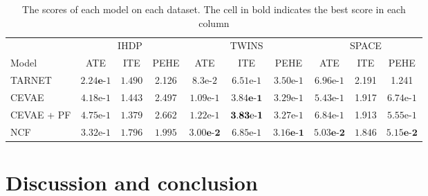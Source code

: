 \documentclass{report}
\begin{document}
\renewcommand{\arraystretch}{1.3}
\begin{table}[]
    \centering
    \begin{adjustbox}{center}
    \begin{tabular}{l||c|c|c||c|c|c||c|c|c|}
        & \multicolumn{3}{|c||}{IHDP} & \multicolumn{3}{|c||}{TWINS} & \multicolumn{3}{|c|}{SPACE} \\ 
         Model & ATE & ITE & PEHE & ATE & ITE & PEHE & ATE & ITE & PEHE \\
         \hline \hline
         TARNET & $\mathbf{2.24\text{e-}}1$ & $1.490$ & 2.126 &   $8.3\text{e-}2$ & $6.51\text{e-}1$ & $3.50\text{e-}1$ &     $6.96\text{e-}1$ & 2.191 & 1.241\\
         \hline
         CEVAE & $4.18\text{e-}1$ & 1.443 & 2.497 &    $1.09\text{e-}1$ & $\mathbf{3.84\textbf{e-}1}$ & $3.29\text{e-}1$ & $5.43\text{e-}1$ & 1.917 & $6.74\text{e-}1$\\
         \hline
         CEVAE + PF & $4.75\text{e-}1$ & $\mathbf{1.379}$ &  2.662 & $1.22\text{e-}1$ & $\mathbf{3.83\text{\text{e-}}1}$ & $3.27\text{e-}1$ & $6.84\text{e-}1$ & 1.913 & $5.55\text{e-}1$ \\
         \hline
         NCF & $3.32\text{e-}1$ & $1.796$ & $\mathbf{1.995}$ &    $\mathbf{3.00\text{e-}2}$ & $6.85\text{e-}1$ & $\mathbf{3.16\text{e-}1}$ & \textbf{$\mathbf{5.03\text{e-}2}$} & $\mathbf{1.846}$ & \textbf{$\mathbf{5.15\text{e-}2}$} \\
    \end{tabular}
    \end{adjustbox}
    \caption{The scores of each model on each dataset. The cell in bold indicates the best score in each column}
    \label{tab:results_experiments}
\end{table}


\chapter{Discussion and conclusion}




\end{document}
